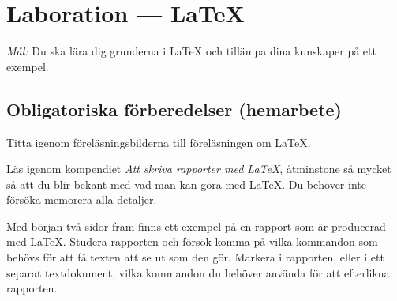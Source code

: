 
\section{Laboration  --- \LaTeX}

\emph{Mål:} Du ska lära dig grunderna i {\LaTeX} och tillämpa dina kunskaper på ett exempel.


\subsection*{Obligatoriska förberedelser (hemarbete)}
\begin{Hemarbete}\firmlist
	\item Titta igenom föreläsningsbilderna till föreläsningen om \LaTeX.
	\item Läs igenom kompendiet \emph{Att skriva rapporter med \LaTeX}, åtminstone så mycket så att du blir bekant med vad man kan göra med \LaTeX. Du behöver inte försöka memorera alla detaljer.
	\item \label{hem:latexuppg} Med början två sidor fram finns ett exempel på en rapport som är producerad med \LaTeX. Studera rapporten och försök komma på vilka kommandon som behövs för att få texten att se ut som den gör. Markera i rapporten, eller i ett separat textdokument, vilka kommandon du behöver använda för att efterlikna rapporten.
\end{Hemarbete}

